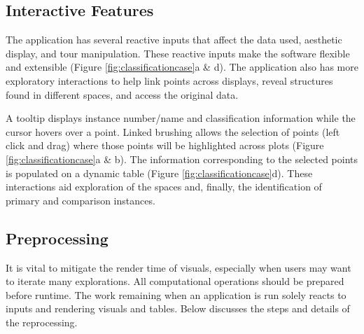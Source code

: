 \documentclass[11pt,twoside]{article}
\begin{document}
\hypertarget{interactive-features}{%
\subsection{Interactive Features}\label{interactive-features}}

The application has several reactive inputs that affect the data used, aesthetic display, and tour manipulation. These reactive inputs make the software flexible and extensible (Figure \ref{fig:classificationcase}a \& d). The application also has more exploratory interactions to help link points across displays, reveal structures found in different spaces, and access the original data.

A tooltip displays instance number/name and classification information while the cursor hovers over a point. Linked brushing allows the selection of points (left click and drag) where those points will be highlighted across plots (Figure \ref{fig:classificationcase}a \& b). The information corresponding to the selected points is populated on a dynamic table (Figure \ref{fig:classificationcase}d). These interactions aid exploration of the spaces and, finally, the identification of primary and comparison instances.

\hypertarget{preprocessing}{%
\subsection{Preprocessing}\label{preprocessing}}

It is vital to mitigate the render time of visuals, especially when users may want to iterate many explorations. All computational operations should be prepared before runtime. The work remaining when an application is run solely reacts to inputs and rendering visuals and tables. Below discusses the steps and details of the reprocessing.
\end{document}

